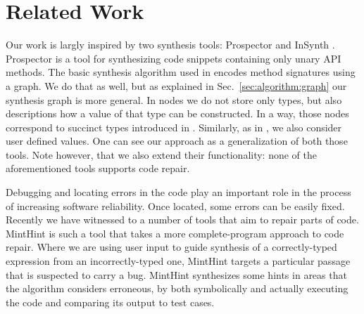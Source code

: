 \section{Related Work}
\label{sec:related}

Our work is largly inspired by two synthesis tools: Prospector \cite{MandelinetALL2005Jungloid} and InSynth \cite{GveroETAL13CompleteCompletionTypesWeights, DBLP:conf/cav/GveroKP11}.
Prospector is a tool for synthesizing code snippets containing only unary API methods. The basic synthesis algorithm used in \cite{MandelinetALL2005Jungloid} encodes method signatures using a graph. We do that as well, but as explained in Sec.~\ref{sec:algorithm:graph}
our synthesis graph is more general. In nodes we do not store only types, but also descriptions how a value of that type can be constructed. In a way, those nodes correspond to succinct types introduced in  \cite{GveroETAL13CompleteCompletionTypesWeights}. Similarly, as in \cite{GveroETAL13CompleteCompletionTypesWeights}, we also consider user defined values. One can see our approach as a generalization of both those tools. Note however, that we also extend their functionality: none of the aforementioned tools supports code repair.





Debugging and locating errors in the code \cite{Pavlinovic:2014,
  Chandra:2011:AD} play an important role in the process of increasing
software reliability. Once located, some errors can be easily
fixed. Recently we have witnessed to a number of tools that aim to
repair parts of code. MintHint \cite{MintHint} is such a tool that
takes a more complete-program approach to code repair. Where we are
using user input to guide synthesis of a correctly-typed expression
from an incorrectly-typed one, MintHint targets a particular passage
that is suspected to carry a bug. MintHint synthesizes some hints in
areas that the algorithm considers erroneous, by both symbolically and
actually executing the code and comparing its output to test cases.



